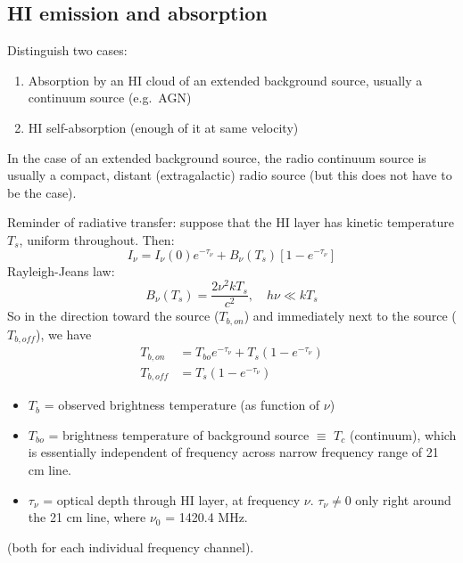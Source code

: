 \documentclass[11pt]{article}
\newcommand{\mar}[1]{\hspace{0pt}\marginpar{-\textcolor{black}{#1}-}}
\begin{document}
\subsection{HI emission and absorption}
\mar{41}Distinguish two cases:
\begin{enumerate}
    \item Absorption by an HI cloud of an extended background source, usually
        a continuum source (e.g.\ AGN)
    \item HI self-absorption (enough of it at same velocity)
\end{enumerate}

In the case of an extended background source,
the radio continuum source is usually a compact, distant
(extragalactic) radio source (but this does not have to be the case).

Reminder of radiative transfer: suppose that the HI layer has kinetic
temperature $T_{s}$, uniform throughout. Then:
\[
    I_{\nu} = I_{\nu}(0)e^{-\tau_{\nu}}
    + B_{\nu} (T_{s}) \left[ 1 - e^{-\tau_{\nu}} \right]
    \]
Rayleigh-Jeans law:
\[
    B_{\nu} (T_{s}) = \frac{2\nu^{2}kT_{s}}{c^{2}}, \quad h\nu \ll kT_{s}
    \]
\mar{42}So in the direction toward the source ($T_{b,on}$) and immediately next
to the source ($T_{b, off}$), we have
\begin{align*}
    T_{b, on} &= T_{bo} e^{-\tau_{\nu}} + T_{s} \left( 1 - e^{-\tau_{\nu}} \right)\\
    T_{b, off} &= T_{s} \left( 1 - e^{-\tau_{\nu}} \right)
\end{align*}
\begin{itemize}
    \item $T_{b}$ = observed brightness temperature (as function of $\nu$)
    \item $T_{bo}$ = brightness temperature of background source $\equiv$ $T_{c}$
        (continuum), which is essentially independent of frequency across narrow
        frequency range of 21 cm line.
    \item $\tau_{\nu}$ = optical depth through HI layer, at frequency $\nu$.
        $\tau_{\nu} \neq 0$ only right around the 21 cm line,
        where $\nu_{0}$ = 1420.4 MHz.
\end{itemize}
(both for each individual frequency channel).
\end{document}
